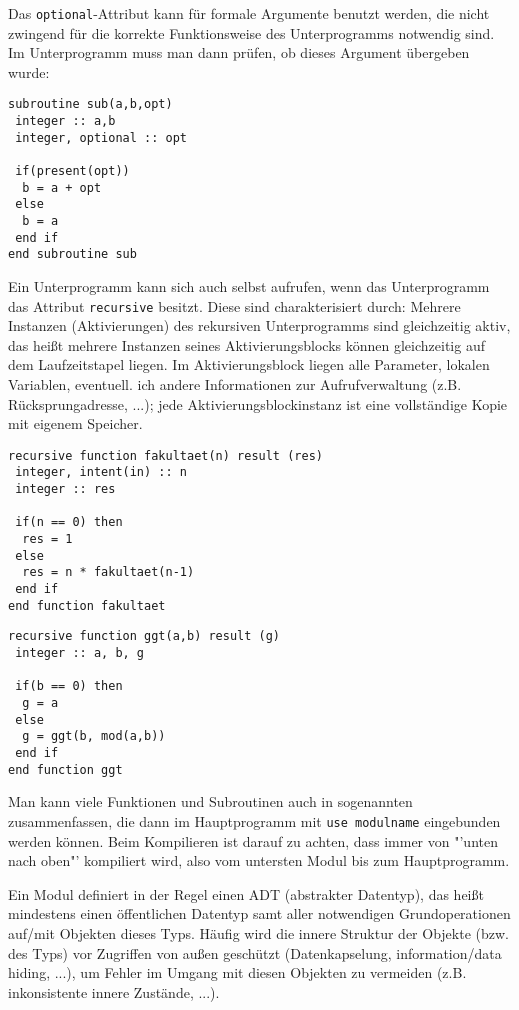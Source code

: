 Das \texttt{optional}-Attribut kann für formale Argumente benutzt werden, die nicht zwingend für die korrekte Funktionsweise des Unterprogramms notwendig sind. Im Unterprogramm muss man dann prüfen, ob dieses Argument übergeben wurde:
\begin{lstlisting}
subroutine sub(a,b,opt)
 integer :: a,b
 integer, optional :: opt
 
 if(present(opt))
  b = a + opt
 else
  b = a
 end if
end subroutine sub
\end{lstlisting}

Ein Unterprogramm kann sich auch selbst aufrufen, wenn das Unterprogramm das Attribut \texttt{recursive} besitzt. Diese sind charakterisiert durch: Mehrere Instanzen (Aktivierungen) des rekursiven Unterprogramms sind gleichzeitig aktiv, das heißt mehrere Instanzen seines Aktivierungsblocks können gleichzeitig auf dem Laufzeitstapel liegen. Im Aktivierungsblock liegen alle Parameter, lokalen Variablen, eventuell. ich andere Informationen zur Aufrufverwaltung (z.B. Rücksprungadresse, ...); jede Aktivierungsblockinstanz ist eine vollständige Kopie mit eigenem Speicher.
\begin{lstlisting}
recursive function fakultaet(n) result (res)
 integer, intent(in) :: n
 integer :: res
 
 if(n == 0) then
  res = 1
 else
  res = n * fakultaet(n-1)
 end if
end function fakultaet
\end{lstlisting}
\begin{lstlisting}
recursive function ggt(a,b) result (g)
 integer :: a, b, g
 
 if(b == 0) then
  g = a
 else
  g = ggt(b, mod(a,b))
 end if
end function ggt
\end{lstlisting}

Man kann viele Funktionen und Subroutinen auch in sogenannten  zusammenfassen, die dann im Hauptprogramm mit \texttt{use modulname} eingebunden werden können. Beim Kompilieren ist darauf zu achten, dass immer von "'unten nach oben"' kompiliert wird, also vom untersten Modul bis zum Hauptprogramm.

Ein Modul definiert in der Regel einen ADT (abstrakter Datentyp), das heißt mindestens einen öffentlichen Datentyp samt aller notwendigen Grundoperationen auf/mit Objekten dieses Typs. Häufig wird die innere Struktur der Objekte (bzw. des Typs) vor Zugriffen von außen geschützt (Datenkapselung, information/data hiding, ...), um Fehler im Umgang mit diesen Objekten zu vermeiden (z.B. inkonsistente innere Zustände, ...).